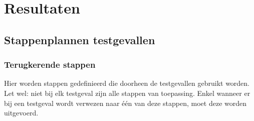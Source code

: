 
\chapter{Resultaten}
\label{ch:resultaten}

\section{Stappenplannen testgevallen}

\subsection{Terugkerende stappen}
\label{recurringsteps}

Hier worden stappen gedefinieerd die doorheen de testgevallen gebruikt worden. Let wel: niet bij elk testgeval zijn alle stappen van toepassing. Enkel wanneer er bij een testgeval wordt verwezen naar één van deze stappen, moet deze worden uitgevoerd.

